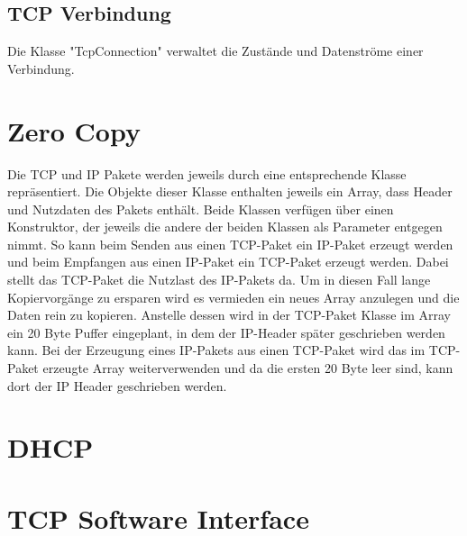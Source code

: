 \subsection{TCP Verbindung}
Die Klasse "{}TcpConnection"{} verwaltet die Zustände und Datenströme einer Verbindung. 


\section{Zero Copy}
Die TCP und IP Pakete werden jeweils durch eine entsprechende Klasse repräsentiert. Die Objekte dieser Klasse enthalten jeweils ein Array, dass Header und Nutzdaten des Pakets enthält. Beide Klassen verfügen über einen Konstruktor, der jeweils die andere der beiden Klassen als Parameter entgegen nimmt. So kann beim Senden aus einen TCP-Paket ein IP-Paket erzeugt werden und beim Empfangen aus einen IP-Paket ein TCP-Paket erzeugt werden. Dabei stellt das TCP-Paket die Nutzlast des IP-Pakets da. Um in diesen Fall lange Kopiervorgänge zu ersparen wird es vermieden ein neues Array anzulegen und die Daten rein zu kopieren. Anstelle dessen wird in der TCP-Paket Klasse im Array ein 20 Byte Puffer eingeplant, in dem der IP-Header später geschrieben werden kann. Bei der Erzeugung eines IP-Pakets aus einen TCP-Paket wird das im TCP-Paket erzeugte Array weiterverwenden und da die ersten 20 Byte leer sind, kann dort der IP Header geschrieben werden. 


\section{DHCP}

\section{TCP Software Interface}

